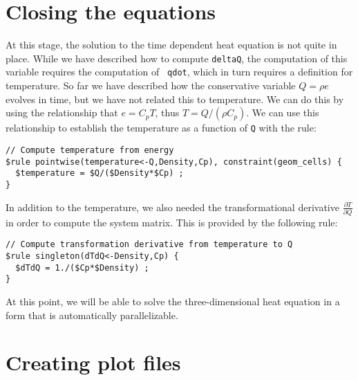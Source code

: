 \documentclass[10pt,epsf,letterpaper,twoside]{book}
\begin{document}
\section{Closing the equations}

At this stage, the solution to the time dependent heat equation is not
quite in place.  While we have described how to compute {\tt deltaQ},
the computation of this variable requires the computation of {\tt
  qdot}, which in turn requires a definition for {temperature}.  So far
we have described how the conservative variable $Q=\rho e$ evolves in
time, but we have not related this to temperature.  We can do this by
using the relationship that $e = C_p T$, thus $T = Q/(\rho C_p)$.  We
can use this relationship to establish the temperature as a function
of {\tt Q} with the rule:
\begin{verbatim}
// Compute temperature from energy
$rule pointwise(temperature<-Q,Density,Cp), constraint(geom_cells) {
  $temperature = $Q/($Density*$Cp) ;
}
\end{verbatim}
In addition to the temperature, we also needed the transformational
derivative $\frac{\partial T}{\partial Q}$ in order to compute the
system matrix.  This is provided by the following rule:
\newpage
\begin{verbatim}
// Compute transformation derivative from temperature to Q
$rule singleton(dTdQ<-Density,Cp) {
  $dTdQ = 1./($Cp*$Density) ;
}
\end{verbatim}
At this point, we will be able to solve the three-dimensional heat
equation in a form that is automatically parallelizable.

\section{Creating plot files}
\end{document}
